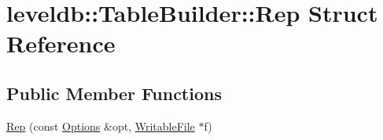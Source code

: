 \hypertarget{structleveldb_1_1_table_builder_1_1_rep}{}\section{leveldb\+:\+:Table\+Builder\+:\+:Rep Struct Reference}
\label{structleveldb_1_1_table_builder_1_1_rep}
\subsection*{Public Member Functions}
\begin{DoxyCompactItemize}
\item 
\hyperlink{structleveldb_1_1_table_builder_1_1_rep_a9d68c60c57e7336aa1fd10fc9f32213e}{Rep} (const \hyperlink{structleveldb_1_1_options}{Options} \&opt, \hyperlink{classleveldb_1_1_writable_file}{Writable\+File} $\ast$f)
\end{DoxyCompactItemize}
